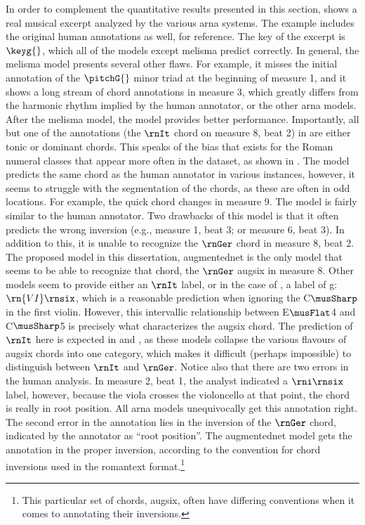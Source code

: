 In order to complement the quantitative results presented in
this section,  shows a real musical
excerpt analyzed by the various \gls{arna} systems. The
example includes the original human annotations as well, for
reference. The key of the excerpt is $\keyg{}$, which all of
the models except \gls{melisma} predict correctly. In
general, the \gls{melisma} model presents several other
flaws. For example, it misses the initial annotation of the
$\pitchG{}$ minor triad at the beginning of measure 1, and
it shows a long stream of chord annotations in measure 3,
which greatly differs from the harmonic rhythm implied by
the human annotator, or the other \gls{arna} models. After
the \gls{melisma} model, the \textcite{chen2021attend} model
provides better performance. Importantly, all but one of the
annotations (the $\rnIt$ chord on measure 8, beat 2) in
\textcite{chen2021attend} are either tonic or dominant
chords. This speaks of the bias that exists for the Roman
numeral classes that appear more often in the dataset, as
shown in . The \textcite{micchi2021deep}
model predicts the same chord as the human annotator in
various instances, however, it seems to struggle with the
segmentation of the chords, as these are often in odd
locations. For example, the quick chord changes in measure
9. The \textcite{mcleod2021modular} model is fairly similar
to the human annotator. Two drawbacks of this model is that
it often predicts the wrong inversion (e.g., measure 1, beat
3; or measure 6, beat 3). In addition to this, it is unable
to recognize the $\rnGer$ chord in measure 8, beat 2. The
proposed model in this dissertation, \gls{augmentednet} is
the only model that seems to be able to recognize that
chord, the $\rnGer$ \gls{augsix} in measure 8. Other models
seem to provide either an $\rnIt$ label, or in the case of
\textcite{mcleod2021modular}, a label of g:$\rn{VI}\rnsix$,
which is a reasonable prediction when ignoring the
C$\musSharp$ in the first violin. However, this intervallic
relationship between E$\musFlat$4 and C$\musSharp$5 is
precisely what characterizes the \gls{augsix} chord. The
prediction of $\rnIt$ here is expected in
\textcite{chen2021attend} and \textcite{micchi2021deep}, as
these models collapse the various flavours of \gls{augsix}
chords into one category, which makes it difficult (perhaps
impossible) to distinguish between $\rnIt$ and $\rnGer$.
Notice also that there are two errors in the human analysis.
In measure 2, beat 1, the analyst indicated a $\rni\rnsix$
label, however, because the viola crosses the violoncello at
that point, the chord is really in root position. All
\gls{arna} models unequivocally get this annotation right.
The second error in the annotation lies in the inversion of
the $\rnGer$ chord, indicated by the annotator as ``root
position''. The \gls{augmentednet} model gets the annotation
in the proper inversion, according to the convention for
chord inversions used in the \gls{romantext}
format.\footnote{This particular set of chords,
\gls{augsix}, often have differing conventions when it comes
to annotating their inversions. }


